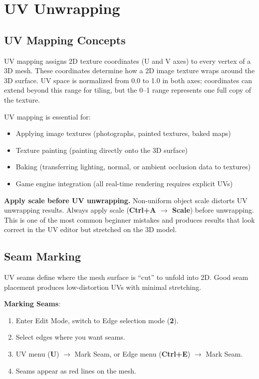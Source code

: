 \section{UV Unwrapping}
\label{sec:uv}

\subsection{UV Mapping Concepts}
\label{sec:uvconcepts}

UV mapping assigns 2D texture coordinates (U and V axes) to every vertex of a 3D mesh. These coordinates determine how a 2D image texture wraps around the 3D surface. UV space is normalized from 0.0 to 1.0 in both axes; coordinates can extend beyond this range for tiling, but the 0--1 range represents one full copy of the texture.

UV mapping is essential for:
\begin{itemize}[leftmargin=2em]
  \item Applying image textures (photographs, painted textures, baked maps)
  \item Texture painting (painting directly onto the 3D surface)
  \item Baking (transferring lighting, normal, or ambient occlusion data to textures)
  \item Game engine integration (all real-time rendering requires explicit UVs)
\end{itemize}

\begin{warningbox}
\textbf{Apply scale before UV unwrapping.} Non-uniform object scale distorts UV unwrapping results. Always apply scale (\textbf{Ctrl+A $\rightarrow$ Scale}) before unwrapping. This is one of the most common beginner mistakes and produces results that look correct in the UV editor but stretched on the 3D model.
\end{warningbox}

\subsection{Seam Marking}
\label{sec:seams}

UV seams define where the mesh surface is ``cut'' to unfold into 2D. Good seam placement produces low-distortion UVs with minimal stretching.

\textbf{Marking Seams}:
\begin{enumerate}[leftmargin=2em]
  \item Enter Edit Mode, switch to Edge selection mode (\textbf{2}).
  \item Select edges where you want seams.
  \item UV menu (\textbf{U}) $\rightarrow$ Mark Seam, or Edge menu (\textbf{Ctrl+E}) $\rightarrow$ Mark Seam.
  \item Seams appear as \textcolor{furry}{red lines} on the mesh.
\end{enumerate}

